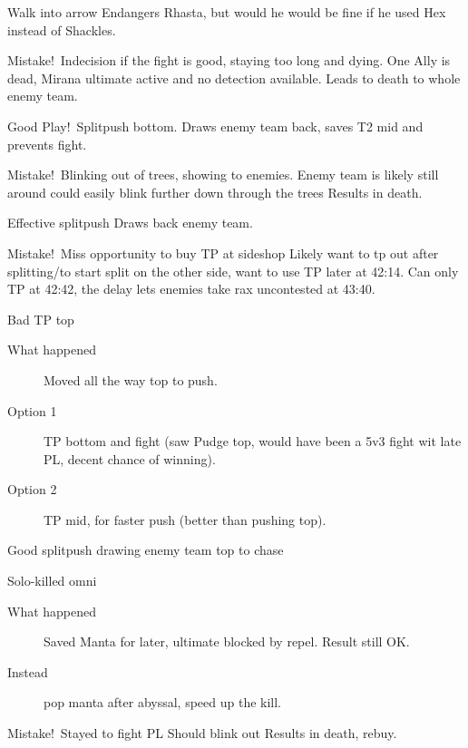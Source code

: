 \documentclass{article}
\newenvironment{eventlog}
    {
        \begin{description}
    }
    {
        \end{description}
    }
\newcommand{\logentry}[3]{\hypertarget{log:#1}{\item[\textcolor{highlight}{#1}] #2 \;#3}}
\newcommand{\mistake}{\colorbox{mistakecolor}{Mistake!}\ }
\newcommand{\goodplay}{\colorbox{goodplaycolor}{Good Play!}\ }
\begin{document}
\begin{eventlog}
    \logentry{33:14}{Walk into arrow}{
    Endangers Rhasta, but would he would be fine if he used Hex instead of Shackles.}
   
    \logentry{33:20}{\mistake Indecision if the fight is good, staying too long and dying.}{
        One Ally is dead, Mirana ultimate active and no detection available. Leads to death to whole enemy team.}


    \logentry{37:10}{\goodplay Splitpush bottom. }{Draws enemy team back, saves T2 mid and prevents fight.}


    \logentry{37:28}{\mistake Blinking out of trees, showing to enemies.}{Enemy team is likely still around
        could easily blink further down through the trees
        Results in death.}


    \logentry{39:10}{Effective splitpush}{Draws back enemy team.}


    \logentry{41:10}{\mistake Miss opportunity to buy TP at sideshop}{ Likely want to tp out after splitting/to start split on the other side, want to use TP later at 42:14.
       Can only TP at 42:42, the delay lets enemies take rax uncontested at 43:40.}
        
     \logentry{42:42}{ Bad TP top}{
    \begin{description}
        \item [What happened] Moved all the way top to push.
        \item [Option 1] TP bottom and fight (saw Pudge top, would have been a 5v3 fight wit late PL, decent chance of winning).
        \item [Option 2] TP mid, for faster push (better than pushing top).
    \end{description}
    }
    
    \logentry{44:50}{Good splitpush}{drawing enemy team top to chase}


    \logentry{47:30}{Solo-killed omni}{
        \begin{description}
        \item [What happened] Saved Manta for later, ultimate blocked by repel. Result still OK.
        \item [Instead] pop manta after abyssal, speed up the kill.
        \end{description}
    }    



    \logentry{47:40}{\mistake Stayed to fight PL}{Should blink out
    Results in death, rebuy.}




\end{eventlog}
\end{document}
